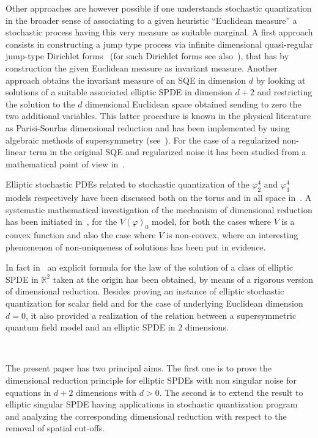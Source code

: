 \documentclass[a4paper,10pt]{article}
\begin{document}
Other approaches are however possible if one understands stochastic
quantization in the broader sense of associating to a given heuristic
``Euclidean measure'' a stochastic process having this very measure as
suitable marginal. A first approach consists in constructing a jump type
process via infinite dimensional quasi-regular jump-type Dirichlet
forms~{\cite{Yoshida,Albeverio2002,Yoshida2008,Yoshida2010}} (for such
Dirichlet forms see also~{\cite{ARu,AFeHKL}}), that has by construction the given
Euclidean measure as invariant measure. Another approach obtains the invariant
measure of an SQE in dimension $d$ by looking at solutions of a suitable
associated elliptic SPDE in dimension $d + 2$ and restricting the solution to
the $d$ dimensional Euclidean space obtained sending to zero the two
additional variables. This latter procedure is known in the physical
literature as Parisi-Sourlas dimensional reduction and has been implemented by
using algebraic methods of supersymmetry (see~{\cite{parisi_random_1979}}).
For the case of a regularized non-linear term in the original SQE and
regularized noise it has been studied from a mathematical point of view
in~{\cite{Klein1984}}.

Elliptic stochastic PDEs related to stochastic quantization of the
$\varphi_2^4$ and $\varphi_3^4$ models respectively have been discussed both
on the torus and in all space in~{\cite{GH18}}. A systematic mathematical
investigation of the mechanism of dimensional reduction has been initiated
in~{\cite{Albeverio2018elliptic}}, for the $V (\varphi)_0$ model, for both the
cases where $V$ is a convex function and also the case where $V$ is
non-convex, where an interesting phenomenon of non-uniqueness of solutions has
been put in evidence.

In fact in~{\cite{Albeverio2018elliptic}} an explicit formula for the law of
the solution of a class of elliptic SPDE in $\mathbb{R}^2$ taken at the origin
has been obtained, by means of a rigorous version of dimensional reduction.
Besides proving an instance of elliptic stochastic quantization for scalar
field and for the case of underlying Euclidean dimension $d = 0$, it also
provided a realization of the relation between a supersymmetric quantum field
model and an elliptic SPDE in $2$ dimensions.

\

The present paper has two principal aims. The first one is to prove the
dimensional reduction principle for elliptic SPDEs with non singular noise for
equations in $d + 2$ dimensions with $d > 0$. The second is to extend the
result to elliptic singular SPDE having applications in stochastic
quantization program and analyzing the corresponding dimensional reduction
with respect to the removal of spatial cut-offs.
\end{document}
